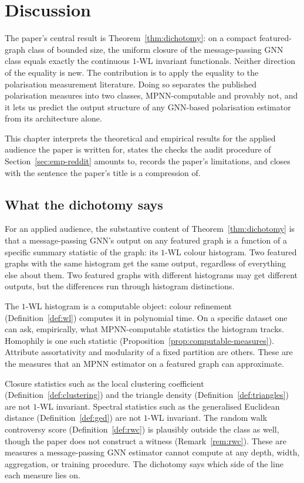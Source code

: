 
\section{Discussion}\label{sec:discussion}

The paper's central result is Theorem~\ref{thm:dichotomy}: on a compact
featured-graph class of bounded size, the uniform closure of the
message-passing GNN class equals exactly the continuous $1$-WL
invariant functionals. Neither direction of the equality is new. The
contribution is to apply the equality to the polarisation measurement
literature. Doing so separates the published polarisation measures
into two classes, MPNN-computable and provably not, and it lets us
predict the output structure of any GNN-based polarisation estimator
from its architecture alone.

This chapter interprets the theoretical and empirical results for
the applied audience the paper is written for, states the checks the
audit procedure of Section~\ref{sec:emp-reddit} amounts to, records the
paper's limitations, and closes with the sentence the paper's title
is a compression of.

\subsection{What the dichotomy says}

For an applied audience, the substantive content of
Theorem~\ref{thm:dichotomy} is that a message-passing GNN's output on any
featured graph is a function of a specific summary statistic of the
graph: its $1$-WL colour histogram. Two featured graphs with the
same histogram get the same output, regardless of everything else
about them. Two featured graphs with different histograms may get
different outputs, but the differences run through histogram
distinctions.

The $1$-WL histogram is a computable object: colour refinement
(Definition~\ref{def:wl}) computes it in polynomial time. On a specific
dataset one can ask, empirically, what MPNN-computable statistics
the histogram tracks. Homophily is one such statistic
(Proposition~\ref{prop:computable-measures}). Attribute assortativity and
modularity of a fixed partition are others. These are the measures
that an MPNN estimator on a featured graph can approximate.

Closure statistics such as the local clustering coefficient
(Definition~\ref{def:clustering}) and the triangle density (Definition~\ref{def:triangles})
are not $1$-WL invariant. Spectral statistics such as the generalised
Euclidean distance (Definition~\ref{def:ged}) are not $1$-WL invariant. The
random walk controversy score (Definition~\ref{def:rwc}) is plausibly outside
the class as well, though the paper does not construct a witness
(Remark~\ref{rem:rwc}). These are measures a message-passing GNN estimator
cannot compute at any depth, width, aggregation, or training
procedure. The
dichotomy says which side of the line each measure lies on.

